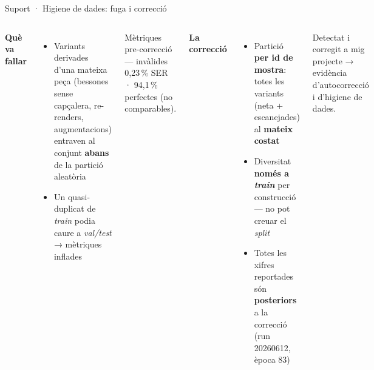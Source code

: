 \documentclass[aspectratio=169,10pt]{beamer}
\newcommand{\code}[1]{{\ttfamily\small #1}}
\begin{document}
\begin{frame}{Suport · Higiene de dades: fuga i correcció}
  \begin{columns}[T]
    \textbf{\color{accent}Què va fallar}
    {\small
    \begin{itemize}\setlength\itemsep{0.3em}
      \item Variants derivades d'una mateixa peça (bessones sense capçalera, re-renders, augmentacions) entraven al conjunt \textbf{abans} de la partició aleatòria
      \item Un quasi-duplicat de \textit{train} podia caure a \textit{val/test} → mètriques inflades
    \end{itemize}}
    \begin{alertblock}{Mètriques pre-correcció — invàlides}
      {\small 0,23\,\% SER · 94,1\,\% perfectes (no comparables).}
    \end{alertblock}

    \textbf{\color{accent}La correcció}
    {\small
    \begin{itemize}\setlength\itemsep{0.3em}
      \item Partició \textbf{per id de mostra}: totes les variants (neta + escanejades) al \textbf{mateix costat}
      \item Diversitat \textbf{només a \textit{train}} per construcció — no pot creuar el \textit{split}
      \item Totes les xifres reportades són \textbf{posteriors} a la correcció (run \code{20260612}, època 83)
    \end{itemize}}
    \vspace{0.2em}
    {\footnotesize\color{muted} Detectat i corregit a mig projecte → evidència d'autocorrecció i d'higiene de dades.}
  \end{columns}
\end{frame}
\end{document}

